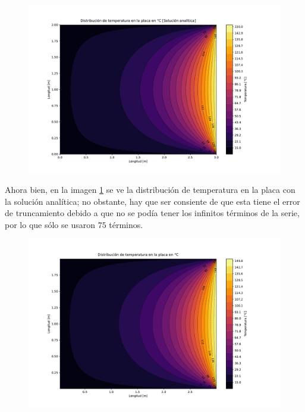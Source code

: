 \documentclass[article,latterpaper]{IEEEtran}
\begin{document}
\begin{figure}[H]
    \centering
    \includegraphics[scale=0.25]{Caso_analitico/Dist_T_An.pdf}
    \caption{ }
    \label{T_Sol_An}
\end{figure}

Ahora bien, en la imagen \ref{T_Sol_An} se ve la distribución de temperatura en la placa con la solución analítica; no obstante, hay que ser consiente de que esta tiene el error de truncamiento debido a que no se podía tener los infinitos términos de la serie, por lo que sólo se usaron $75$ términos.

\begin{figure}[H]
    \centering
    \includegraphics[scale=0.25]{Caso_analitico/Dist_T.pdf}
    \caption{ }
    \label{T_Sol_An_num}
\end{figure}
\end{document}
